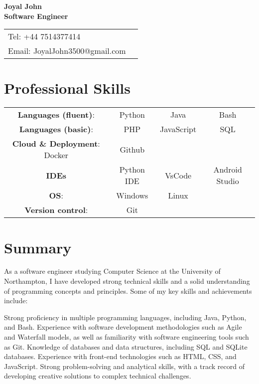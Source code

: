 \documentclass[10pt]{article}
\begin{document}
\linespread{1.0}



{\center
{\Large\bf Joyal John \\ Software Engineer \vspace{0.1in} }

\begin{center} 
\begin{tabular*}{1.0\textwidth}%
   {@{\extracolsep{\fill}}lr}
	Tel:   +44 7514377414\\
	Email: JoyalJohn3500@gmail.com \\
\end{tabular*}
\end{center}


\addtolength{\itemsep}{-1ex} \addtolength{\topsep}{-1.5ex}


\section*{\bf  Professional Skills}
\begin{center}
\begin{tabular}{c c c c}
{\bf Languages (fluent)}: & Python & Java & Bash\\
{\bf Languages (basic)}: &  PHP & JavaScript & SQL\\
{\bf Cloud \& Deployment}: Docker & Github\\
{\bf IDEs} & Python IDE & VsCode & Android Studio \\
{\bf OS}: & Windows & Linux \\
{\bf Version control}: & Git \\

\end{tabular}
\end{center}


\section*{\bf Summary}

As a software engineer studying Computer Science at the University of Northampton, I have developed strong technical skills and a solid understanding of programming concepts and principles. Some of my key skills and achievements include:

Strong proficiency in multiple programming languages, including Java, Python, and Bash.
Experience with software development methodologies such as Agile and Waterfall models, as well as familiarity with software engineering tools such as Git.
Knowledge of databases and data structures, including SQL and SQLite databases.
Experience with front-end technologies such as HTML, CSS, and JavaScript.
Strong problem-solving and analytical skills, with a track record of developing creative solutions to complex technical challenges.

}
\end{document}
